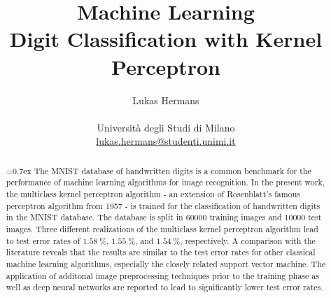 \title{\large Machine Learning \\ \LARGE
 Digit Classification with Kernel Perceptron}
\author{Lukas Hermans\\ \\
{Università degli Studi di Milano} \\
\href{mailto:lukas.hermans@studenti.unimi.it}
{lukas.hermans@studenti.unimi.it}}

\maketitle

\begin{abstract} 
\noindent
{}\font=0.7ex%
The MNIST database of handwritten digits is a common benchmark for the performance of machine learning algorithms for image recognition. In the present work, the multiclass kernel perceptron algorithm - an extension of Rosenblatt's famous perceptron algorithm from 1957 - is trained for the classification of handwritten digits in the MNIST database. The database is split in $60000$ training images and $10000$ test images. Three different realizations of the multiclass kernel perceptron algorithm lead to test error rates of $\SI{1.58}{\percent}$, $\SI{1.55}{\percent}$, and $\SI{1.54}{\percent}$, respectively. A comparison with the literature reveals that the results are similar to the test error rates for other classical machine learning algorithms, especially the closely related support vector machine. The application of additonal image preprocessing techniques prior to the training phase as well as deep neural networks are reported to lead to significantly lower test error rates. 
\end{abstract}
